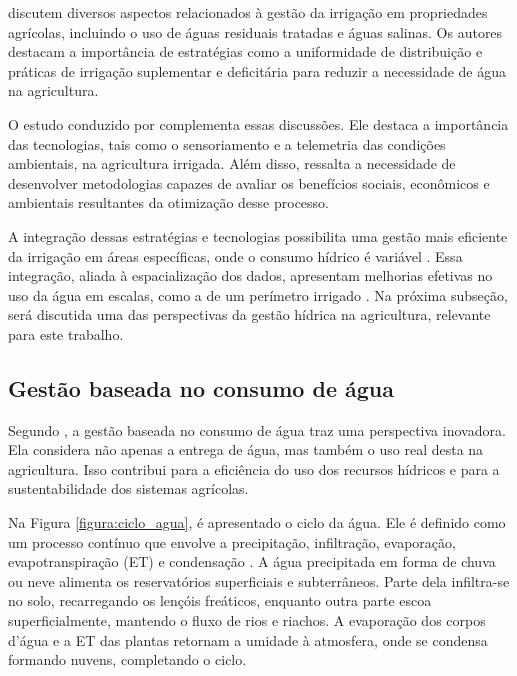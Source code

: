 \textcite{Pereira_irrigation2002} discutem diversos aspectos relacionados à gestão da irrigação em propriedades agrícolas, incluindo o uso de águas residuais tratadas e águas salinas. Os autores destacam a importância de estratégias como a uniformidade de distribuição e práticas de irrigação suplementar e deficitária para reduzir a necessidade de água na agricultura.

O estudo conduzido por \textcite{Burton_irrigation2010} complementa essas discussões. Ele destaca a importância das tecnologias, tais como o sensoriamento e a telemetria das condições ambientais, na agricultura irrigada. Além disso, ressalta a necessidade de desenvolver metodologias capazes de avaliar os benefícios sociais, econômicos e ambientais resultantes da otimização desse processo.

A integração dessas estratégias e tecnologias possibilita uma gestão mais eficiente da irrigação em áreas específicas, onde o consumo hídrico é variável \parencite{carmody_fao2023}. Essa integração, aliada à espacialização dos dados, apresentam melhorias efetivas no uso da água em escalas, como a de um perímetro irrigado \parencite{Burton_irrigation2010, Ramos_irrigacao2022}. Na próxima subseção, será discutida uma das perspectivas da gestão hídrica na agricultura, relevante para este trabalho.

\subsection{Gestão baseada no consumo de água}

Segundo \textcite{carmody_fao2023}, a gestão baseada no consumo de água traz uma perspectiva inovadora. Ela considera não apenas a entrega de água, mas também o uso real desta na agricultura. Isso contribui para a eficiência do uso dos recursos hídricos e para a sustentabilidade dos sistemas agrícolas. 

Na Figura \ref{figura:ciclo_agua}, é apresentado o ciclo da água. Ele é definido como um processo contínuo que envolve a precipitação, infiltração, evaporação, evapotranspiração (ET) e condensação \parencite{carmody_fao2023}. A água precipitada em forma de chuva ou neve alimenta os reservatórios superficiais e subterrâneos. Parte dela infiltra-se no solo, recarregando os lençóis freáticos, enquanto outra parte escoa superficialmente, mantendo o fluxo de rios e riachos. A evaporação dos corpos d'água e a ET das plantas retornam a umidade à atmosfera, onde se condensa formando nuvens, completando o ciclo.

